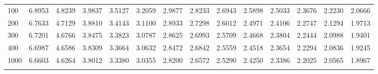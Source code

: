 {\begin{tabular}{l|lllllllllllll}
\\ 
100 & 6.8953 & 4.8239 & 3.9837 & 3.5127 & 3.2059 & 2.9877 & 2.8233 & 2.6943 & 2.5898 & 2.5033 & 2.3676 & 2.2230 & 2.0666 \\[5pt] \arrayrulecolor{light-gray}\hline\arrayrulecolor{black}  
200 & 6.7633 & 4.7129 & 3.8810 & 3.4143 & 3.1100 & 2.8933 & 2.7298 & 2.6012 & 2.4971 & 2.4106 & 2.2747 & 2.1294 & 1.9713 \\[5pt] \arrayrulecolor{light-gray}\hline\arrayrulecolor{black}  
300 & 6.7201 & 4.6766 & 3.8475 & 3.3823 & 3.0787 & 2.8625 & 2.6993 & 2.5709 & 2.4668 & 2.3804 & 2.2444 & 2.0988 & 1.9401 \\[5pt] \arrayrulecolor{light-gray}\hline\arrayrulecolor{black}  
400 & 6.6987 & 4.6586 & 3.8309 & 3.3664 & 3.0632 & 2.8472 & 2.6842 & 2.5559 & 2.4518 & 2.3654 & 2.2294 & 2.0836 & 1.9245 \\[5pt] \arrayrulecolor{light-gray}\hline\arrayrulecolor{black}  
1000 & 6.6603 & 4.6264 & 3.8012 & 3.3380 & 3.0355 & 2.8200 & 2.6572 & 2.5290 & 2.4250 & 2.3386 & 2.2025 & 2.0565 & 1.8967 \\[5pt] \arrayrulecolor{light-gray}\hline\arrayrulecolor{black}  
\end{tabular}}
